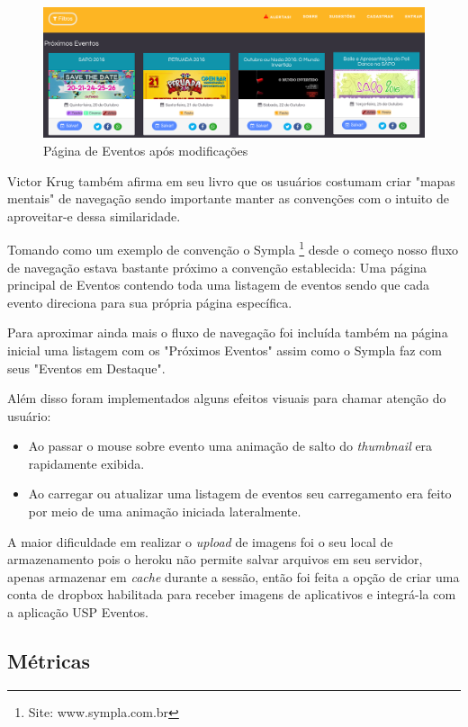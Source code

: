 \begin{figure}[htb]
\includegraphics[width=15cm]{figuras/events_page_3aiteracao}
\caption{\label{fig:events_page_3aiteracao}  Página de Eventos após modificações}
\end{figure}
	\par Victor Krug também afirma em seu livro que os usuários costumam criar "mapas mentais" de navegação sendo importante manter as convenções com o intuito de aproveitar-e dessa similaridade.
	\par Tomando como um exemplo de convenção o Sympla \footnote{Site: www.sympla.com.br} desde o começo nosso fluxo de navegação estava bastante próximo a convenção establecida: Uma página principal de Eventos contendo toda uma listagem de eventos sendo que cada evento direciona para sua própria página específica.
	\par Para aproximar ainda mais o fluxo de navegação foi incluída também na página inicial uma listagem com os "Próximos Eventos" assim como o Sympla faz com seus "Eventos em Destaque". 
	\par Além disso foram implementados alguns efeitos visuais para chamar atenção do usuário:
	\begin{itemize}
	\item Ao passar o mouse sobre evento uma animação de salto do \emph{thumbnail} era rapidamente exibida.
	\item Ao carregar ou atualizar uma listagem de eventos seu carregamento era feito por meio de uma animação iniciada lateralmente.
	\end{itemize}
	\par A maior dificuldade em realizar o \emph{upload} de imagens foi o seu local de armazenamento pois  o heroku não permite salvar arquivos em seu servidor, apenas armazenar em \emph{cache} durante a sessão, então foi feita a opção de criar uma conta de dropbox habilitada para receber imagens de aplicativos e integrá-la com a aplicação USP Eventos.

\subsection{Métricas}

